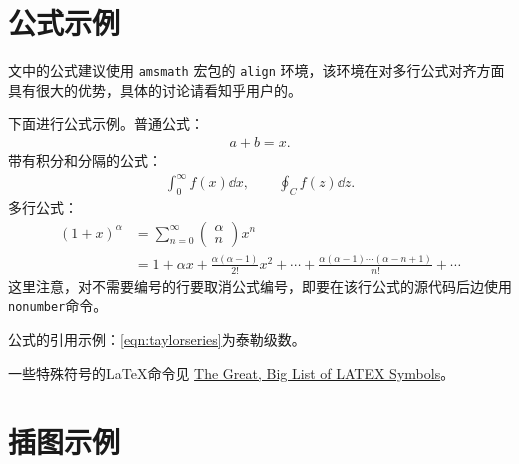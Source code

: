 \section{公式示例} 

文中的公式建议使用 \texttt{amsmath} 宏包的 \texttt{align} 环境，该环境在对多行公式对齐方面具有很大的优势，具体的讨论请看知乎用户\href{https://www.zhihu.com/people/bo-xue-duo-wen-63}{}的\href{https://www.zhihu.com/question/477805692/answer/2045084752}{}。

下面进行公式示例。普通公式：
\begin{align}
    a+b=x.
\end{align}
带有积分和分隔的公式：
\begin{align}
   \int^{\infty}_{0} f(x)\dd{x}, \qquad \oint_{C} f(z)\dd {z}.
\end{align}
多行公式：
\begin{align}
    \left(1+x\right)^{\alpha} &= \sum^{\infty}_{n=0}\left(\begin{matrix} \alpha \\ n\end{matrix}\right)x^n \nonumber \\ 
    &= 1 + \alpha x + \frac{\alpha(\alpha-1)}{2!}x^2 + \cdots + \frac{\alpha(\alpha-1)\cdots(\alpha-n+1)}{n!} + \cdots
    \label{eqn:taylorseries}
\end{align}
这里注意，对不需要编号的行要取消公式编号，即要在该行公式的源代码后边使用 \texttt{ nonumber}命令。

公式的引用示例：\autoref{eqn:taylorseries}为泰勒级数。

一些特殊符号的\LaTeX{}命令见 \href{https://mirrors.ustc.edu.cn/CTAN/info/symbols/comprehensive/symbols-a4.pdf}{The Great, Big List of LATEX Symbols}。

\section{插图示例}

